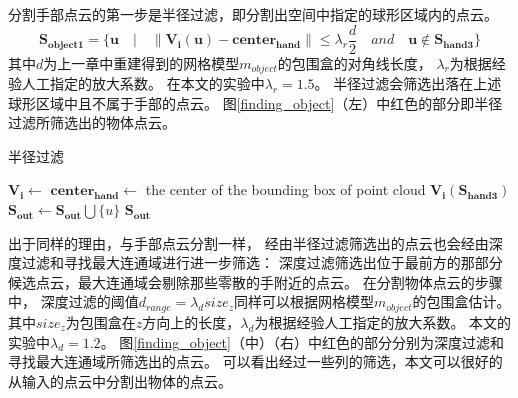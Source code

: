 分割手部点云的第一步是半径过滤，即分割出空间中指定的球形区域内的点云。
\begin{equation}
    \bm{S_{object1}} =
    \{
        \bm{u} \quad
    |   \quad
        \|\bm{V_i}(\bm{u}) - \bm{center_{hand}}\| \leqslant {\lambda}_{r}\frac{d}{2}
        \quad and \quad
        \bm{u}\notin \bm{S_{hand3}}
    \}
\end{equation}
其中$d$为上一章中重建得到的网格模型$m_{object}$的包围盒的对角线长度，
${\lambda}_r$为根据经验人工指定的放大系数。
在本文的实验中${\lambda}_r=1.5$。
半径过滤会筛选出落在上述球形区域中且不属于手部的点云。
图\ref{finding_object}（左）中红色的部分即半径过滤所筛选出的物体点云。
\begin{algorithm}
    \caption{半径过滤}
    \label{alg_rfilter}
    \begin{algorithmic}[1]
            \State $\bm{V_i} \gets$ 
            \State $\bm{center_{hand}} \gets$ the center of the bounding box of point cloud $\bm{V_i}(\bm{S_{hand3}})$
                    \State $\bm{S_{out}} \gets \bm{S_{out}} \bigcup \{u\}$
                \EndIf
            \EndFor
            \State \Return $\bm{S_{out}}$
        \EndFunction
    \end{algorithmic}
\end{algorithm} 

出于同样的理由，与手部点云分割一样，
经由半径过滤筛选出的点云也会经由深度过滤和寻找最大连通域进行进一步筛选：
深度过滤筛选出位于最前方的那部分候选点云，最大连通域会剔除那些零散的手附近的点云。
在分割物体点云的步骤中，
深度过滤的阈值$d_{range} = {\lambda}_{d} size_z$同样可以根据网格模型$m_{object}$的包围盒估计。
其中$size_z$为包围盒在$z$方向上的长度，${\lambda}_d$为根据经验人工指定的放大系数。
本文的实验中${\lambda}_d = 1.2$。
图\ref{finding_object}（中）（右）中红色的部分分别为深度过滤和寻找最大连通域所筛选出的点云。
可以看出经过一些列的筛选，本文可以很好的从输入的点云中分割出物体的点云。
